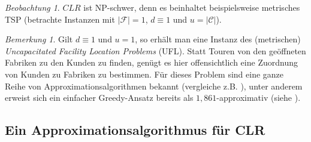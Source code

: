 \documentclass[a4paper,ngerman,11pt,bibtotoc]{scrartcl}
\theoremstyle{definition}
\theoremstyle{plain}
\theoremstyle{remark}
\newtheorem{bem}[defn]{Bemerkung}
\newtheorem{beob}[defn]{Beobachtung}
\newcommand{\ClientSet}{\mathscr{C}}
\newcommand{\FacilitySet}{\mathscr{F}}
\newcommand{\CLR}{CLR}
\newcommand{\UFL}{UFL}
\begin{document}
\begin{beob}
	$\CLR{}$ ist NP-schwer, denn es beinhaltet beispielsweise metrisches TSP (betrachte Instanzen mit $|\FacilitySet| = 1$, $d \equiv 1$ und $u = |\ClientSet|$).
\end{beob}

\begin{bem}
	Gilt $d \equiv 1$ und $u = 1$, so erhält man eine Instanz des (metrischen) \emph{Uncapacitated Facility Location Problems} (\UFL). Statt Touren von den geöffneten Fabriken zu den Kunden zu finden, genügt es hier offensichtlich eine Zuordnung von Kunden zu Fabriken zu bestimmen. Für dieses Problem sind eine ganze Reihe von Approximationsalgorithmen bekannt (vergleiche z.B. \cite{AAfFLP}), unter anderem erweist sich ein einfacher Greedy-Ansatz bereits als $1,861$-approximativ (siehe \cite{GreedyApprox}).
\end{bem}


	\subsection{Ein Approximationsalgorithmus für \CLR}
\end{document}
